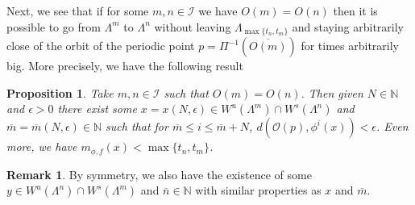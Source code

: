 \documentclass[12pt]{amsart}
\theoremstyle{plain} %
\newtheorem{proposition}[theorem]{Proposition}
\theoremstyle{definition} %
\newtheorem{remark}[theorem]{Remark}
\numberwithin{equation}{section}
\begin{document}
Next, we see that if for some $m,n\in \mathcal{I}$ we have $O(m)=O(n)$ then it is possible to go from $\Lambda^{m}$ to $\Lambda^{n}$ without leaving $\Lambda_{\max\{t_n,t_m\}}$ and staying arbitrarily close of the orbit of the periodic point $p=\Pi^{-1}(\overline{O(m)})$ for times arbitrarily big. More precisely, we have the following result
\begin{proposition}\label{m,n}
Take $m,n\in \mathcal{I}$ such that $O(m)=O(n)$. Then given $N\in \mathbb{N}$ and $\epsilon>0$ there exist some $x=x(N,\epsilon)\in W^u(\Lambda^m)\cap W^s(\Lambda^n)$ and $\overline{m}=\overline{m}(N,\epsilon)\in \mathbb{N}$ such that for $\overline{m} \leq i \leq \overline{m}+N$, $d(\mathcal{O}(p),\phi^i(x))<\epsilon$. Even more, we have $m_{\phi,f}(x) < \max\{t_n,t_m\}$.
\end{proposition}
\begin{remark}
 By symmetry, we also have the existence of some $y\in W^u(\Lambda^n)\cap W^s(\Lambda^m)$ and $\overline{n}\in \mathbb{N}$ with similar properties as $x$ and $\overline{m}$. 
\end{remark}
\end{document}
